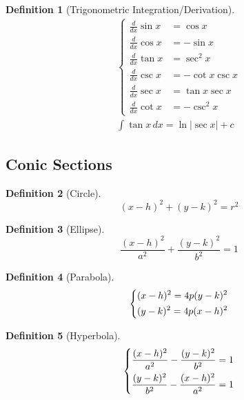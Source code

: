 \documentclass[11pt]{article}
\theoremstyle{definition}
\newtheorem{definition}{Definition}[section]
\theoremstyle{remark}
\begin{document}
\begin{definition}[Trigonometric Integration/Derivation]
\begin{align}
\begin{cases}
\frac{d}{dx} \sin x &= \cos x \\
\frac{d}{dx} \cos x &= -\sin x \\
\frac{d}{dx} \tan x &= \sec^2 x \\
\frac{d}{dx} \csc x &= -\cot x \csc x \\
\frac{d}{dx} \sec x &= \tan x \sec x \\
\frac{d}{dx} \cot x &= -\csc^2 x
\end{cases} \\
\int \tan x \, dx = \ln |\sec x| + c
\end{align}
\end{definition}
\subsection{Conic Sections}
\begin{definition}[Circle] \begin{equation}
(x-h)^2 + (y-k)^2 = r^2
\end{equation}
\end{definition}

\begin{definition}[Ellipse] \begin{equation}
\frac{(x-h)^2}{a^2} + \frac{(y-k)^2}{b^2} = 1
\end{equation}
\end{definition}

\begin{definition}[Parabola] \begin{equation}
\begin{dcases}
(x-h)^2 = 4p(y-k)^2 \\
(y-k)^2 = 4p(x-h)^2
\end{dcases}
\end{equation}
\end{definition}

\begin{definition}[Hyperbola] \begin{equation}
\begin{dcases}
\frac{(x-h)^2}{a^2} - \frac{(y-k)^2}{b^2} = 1 \\
\frac{(y-k)^2}{b^2} - \frac{(x-h)^2}{a^2} = 1
\end{dcases}
\end{equation}
\end{definition}
\end{document}
